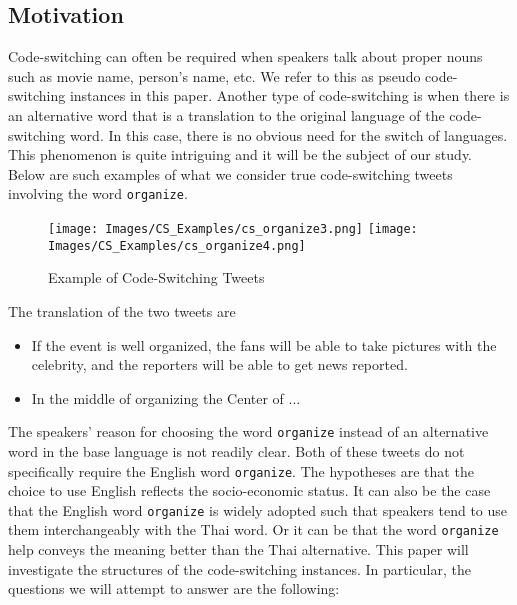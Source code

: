 \documentclass[conference]{IEEEtran}
\begin{document}
 

\subsection{Motivation}
Code-switching can often be required when speakers talk about proper nouns such as movie name, person's name, etc. We refer to this as pseudo code-switching instances in this paper. Another type of code-switching is when there is  an alternative word that is a translation to the original language of the code-switching word. In this case, there is no obvious need for the switch of languages. This phenomenon is quite intriguing and it will be the subject of our study.   Below are such examples of what we consider true code-switching tweets involving the word {\tt organize}.

\begin{figure}[H]
	\centering
	\texttt{[image: Images/CS\_Examples/cs\_organize3.png]}
	\texttt{[image: Images/CS\_Examples/cs\_organize4.png]}
	\caption{Example of Code-Switching Tweets}
	\label{fig:ex_csTweets}
\end{figure}

The translation of the two tweets are 
\begin{itemize}
\item If the event is well organized, the fans will be able to take pictures with the celebrity, and the reporters will be able to get news reported. 
\item In the middle of organizing the Center of ...
\end{itemize}


  The speakers' reason for choosing  the word {\tt organize} instead of an alternative word in the base language is not readily clear. Both of these tweets do not specifically require the English word {\tt organize}. The hypotheses are that the choice to use English reflects the socio-economic status. It can also be the case that the English word {\tt organize} is widely adopted such that speakers tend to use them interchangeably with the Thai word. Or it can be that the word {\tt organize}  help conveys the meaning better than the Thai alternative. This paper will investigate the structures of the code-switching instances.  %
In particular, the questions we will attempt to  answer are the following:
\end{document}

